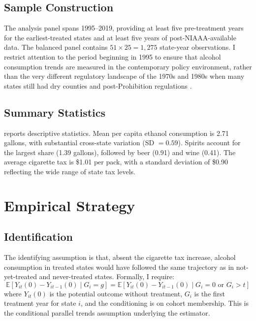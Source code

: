 \documentclass[12pt]{article}
\newcommand{\E}{\mathbb{E}}
\begin{document}
\subsection{Sample Construction}

The analysis panel spans 1995--2019, providing at least five pre-treatment years for the earliest-treated states and at least five years of post-NIAAA-available data. The balanced panel contains $51 \times 25 = 1{,}275$ state-year observations. I restrict attention to the period beginning in 1995 to ensure that alcohol consumption trends are measured in the contemporary policy environment, rather than the very different regulatory landscape of the 1970s and 1980s when many states still had dry counties and post-Prohibition regulations \citep{saffer1991alcohol}.

\subsection{Summary Statistics}

 reports descriptive statistics. Mean per capita ethanol consumption is 2.71 gallons, with substantial cross-state variation (SD $= 0.59$). Spirits account for the largest share (1.39 gallons), followed by beer (0.91) and wine (0.41). The average cigarette tax is \$1.01 per pack, with a standard deviation of \$0.90 reflecting the wide range of state tax levels.




\section{Empirical Strategy}
\label{sec:strategy}

\subsection{Identification}

The identifying assumption is that, absent the cigarette tax increase, alcohol consumption in treated states would have followed the same trajectory as in not-yet-treated and never-treated states. Formally, I require:
\begin{equation}
\E[Y_{it}(0) - Y_{it-1}(0) \mid G_i = g] = \E[Y_{it}(0) - Y_{it-1}(0) \mid G_i = 0 \text{ or } G_i > t]
\end{equation}
where $Y_{it}(0)$ is the potential outcome without treatment, $G_i$ is the first treatment year for state $i$, and the conditioning is on cohort membership. This is the conditional parallel trends assumption underlying the \citet{callaway2021difference} estimator.
\end{document}
